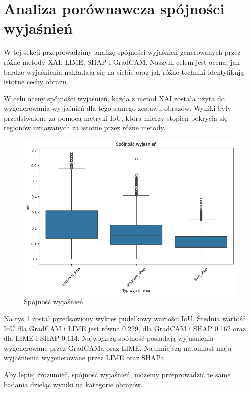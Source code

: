 \section*{Analiza porównawcza spójności wyjaśnień}
W tej sekcji przeprowadzimy analizę spójności wyjaśnień generowanych przez różne metody XAI: LIME, SHAP i GradCAM.
Naszym celem jest ocena, jak bardzo wyjaśnienia nakładają się na siebie oraz jak różne techniki identyfikują istotne cechy obrazu.

W celu oceny spójności wyjaśnień, każda z metod XAI została użyta do wygenerowania wyjjaśnień dla tego samego zestawu obrazów.
Wyniki były przedstwaione za pomocą metryki IoU, która mierzy stopień pokrycia się regionów uznawanych za istotne przez różne metody.

\begin{figure}
	\centering\includegraphics[width=.6\textwidth]{img/base_coherence}
	\caption{Spójność wyjaśnień}  \label{rys:base_coherence}
\end{figure}

Na rys \ref{rys:base_coherence} został przedsawiony wykres pudełkowy wartości IoU.
Średnia wartość IoU dla GradCAM i LIME jest równa 0.229, dla GradCAM i SHAP 0.162 oraz dla LIME i SHAP 0.114.
Największą spójność posiadają wyjaśnienia wygenerowane przez GradCAMa oraz LIME.
Najmniejszą natomiast mają wyjaśnienia wygenerowane przez LIME oraz SHAPa.

Aby lepiej zrozumieć, spójność wyjaśnień, możemy przeprowadzić te same badania dzieląc wyniki na kategorie obrazów.

